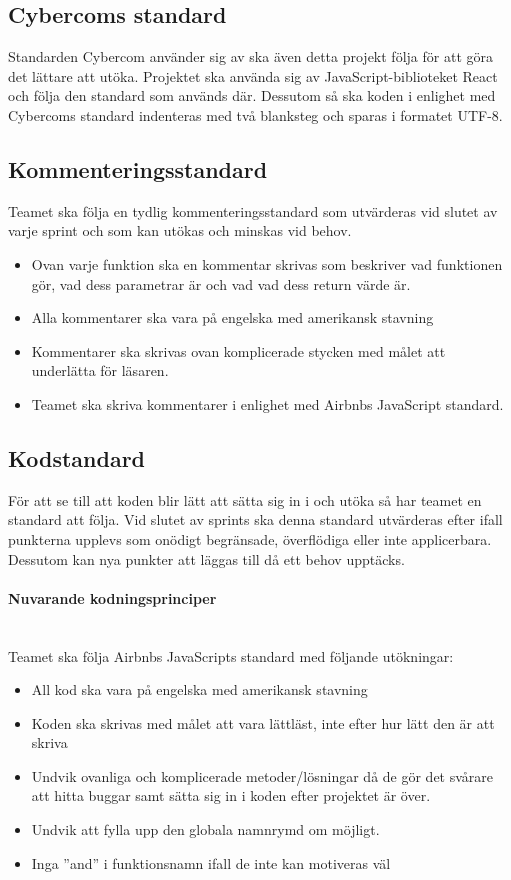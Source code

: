 \documentclass[10pt]{article}
\begin{document}
	\subsection{Cybercoms standard}
	Standarden Cybercom använder sig av ska även detta projekt följa för att göra det lättare att utöka. Projektet ska använda sig av JavaScript-biblioteket React och följa den standard som används där. Dessutom så ska koden i enlighet med Cybercoms standard indenteras med två blanksteg och sparas i formatet UTF-8.
	
	
	\subsection{Kommenteringsstandard}
	Teamet ska följa en tydlig kommenteringsstandard som utvärderas vid slutet av varje sprint och som kan utökas och minskas vid behov.
	
	\begin{itemize}
		\item 	Ovan varje funktion ska en kommentar skrivas som beskriver vad funktionen gör, vad dess parametrar är och vad vad dess return värde är.
		\item Alla kommentarer ska vara på engelska med amerikansk stavning
		\item Kommentarer ska skrivas ovan komplicerade stycken med målet att underlätta för läsaren.
		\item Teamet ska skriva kommentarer i enlighet med Airbnbs JavaScript standard.
	\end{itemize}

	
	\subsection{Kodstandard}
	För att se till att koden blir lätt att sätta sig in i och utöka så har teamet en standard att följa. Vid slutet av sprints ska denna standard utvärderas efter ifall punkterna upplevs som onödigt begränsade, överflödiga eller inte applicerbara. Dessutom kan nya punkter att läggas till då ett behov upptäcks.

	\paragraph{Nuvarande kodningsprinciper} \mbox{}
	\\
	Teamet ska följa Airbnbs JavaScripts standard med följande utökningar:
	\begin{itemize}
	\item All kod ska vara på engelska med amerikansk stavning
	\item Koden ska skrivas med målet att vara lättläst, inte efter hur lätt den är att skriva
	\item Undvik ovanliga och komplicerade metoder/lösningar då de gör det svårare att hitta buggar samt sätta sig in i koden efter projektet är över.
	\item Undvik att fylla upp den globala namnrymd om möjligt.
	\item Inga  ''and'' i funktionsnamn ifall de inte kan motiveras väl
	
	\end{itemize}
	
\end{document}
